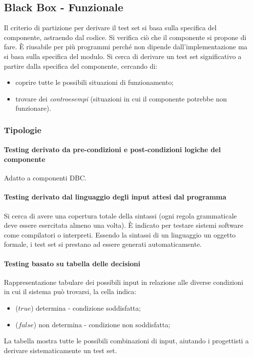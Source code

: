 \subsection{Black Box - Funzionale}

Il criterio di partizione per derivare il test set si basa sulla specifica del componente, astraendo dal codice. Si verifica ciò che il componente si propone di fare. È riusabile per più programmi perché non dipende dall'implementazione ma si basa sulla specifica del modulo. Si cerca di derivare un test set significativo a partire dalla specifica del componente, cercando di:
\begin{itemize}
    \item coprire tutte le possibili situazioni di funzionamento;
    \item trovare dei \textit{controesempi} (situazioni in cui il componente potrebbe non funzionare). 
\end{itemize}

\subsubsection{Tipologie}

\paragraph{Testing derivato da pre-condizioni e post-condizioni logiche del componente} Adatto a componenti DBC.

\paragraph{Testing derivato dal linguaggio degli input attesi dal programma} Si cerca di avere una copertura totale della sintassi (ogni regola grammaticale deve essere esercitata almeno una volta). È indicato per testare sistemi software come compilatori o interpreti. Essendo la sintassi di un linguaggio un oggetto formale, i test set si prestano ad essere generati automaticamente.

\paragraph{Testing basato su tabella delle decisioni} Rappresentazione tabulare dei possibili input in relazione alle diverse condizioni in cui il sistema può trovarsi, la cella indica:
\begin{itemize}
    \item ($true$) determina - condizione soddisfatta;
    \item ($false$) non determina - condizione non soddisfatta;
\end{itemize}
La tabella mostra tutte le possibili combinazioni di input, aiutando i progettisti a derivare sistematicamente un test set.


